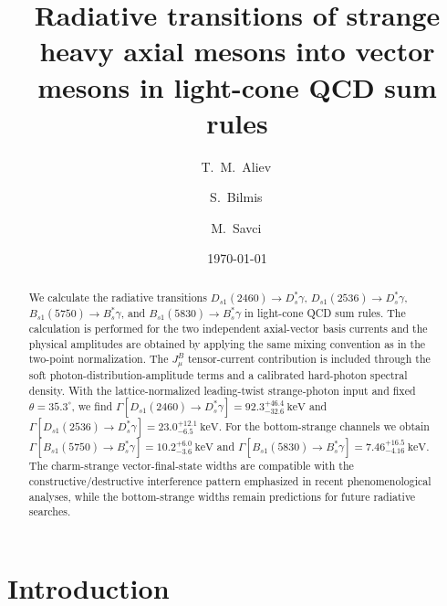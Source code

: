 \documentclass[aps,prd,a4paper,preprint,preprintnumbers,titlepage,
nofootinbib,superscriptaddress]{revtex4-2}
\newcommand{\Dst}{D_s^\ast}
\newcommand{\Dsone}{D_{s1}}
\newcommand{\Bst}{B_s^\ast}
\newcommand{\Bsone}{B_{s1}}
\newcommand{\keV}{\mathrm{keV}}
\providecommand{\orcidlink}[1]{}
\begin{document}
\title{Radiative transitions of strange heavy axial mesons into vector mesons in light-cone QCD sum rules}

\author{T.~M.~Aliev\,\orcidlink{0000-0001-8400-7370}}

\author{S.~Bilmis\,\orcidlink{0000-0002-0830-8873}}

\author{M.~Savci\,\orcidlink{0000-0002-6221-4595}}

\date{\today}

\begin{abstract}
We calculate the radiative transitions
\(\Dsone(2460)\to\Dst\gamma\),
\(\Dsone(2536)\to\Dst\gamma\),
\(B_{s1}(5750)\to\Bst\gamma\), and
\(\Bsone(5830)\to\Bst\gamma\)
in light-cone QCD sum rules.  The calculation is performed for the two
independent axial-vector basis currents and the physical amplitudes are
obtained by applying the same mixing convention as in the two-point
normalization.  The \(J_\mu^B\) tensor-current contribution is included through
the soft photon-distribution-amplitude terms and a calibrated hard-photon
spectral density.  With the lattice-normalized leading-twist strange-photon
input and fixed \(\theta=35.3^\circ\), we find
\(\Gamma[\Dsone(2460)\to\Dst\gamma]=92.3^{+46.4}_{-32.6}~\keV\) and
\(\Gamma[\Dsone(2536)\to\Dst\gamma]=23.0^{+12.1}_{-6.5}~\keV\).
For the bottom-strange channels we obtain
\(\Gamma[B_{s1}(5750)\to\Bst\gamma]=10.2^{+6.0}_{-3.6}~\keV\) and
\(\Gamma[\Bsone(5830)\to\Bst\gamma]=7.46^{+16.5}_{-4.16}~\keV\).
The charm-strange vector-final-state widths are compatible with the
constructive/destructive interference pattern emphasized in recent
phenomenological analyses, while the bottom-strange widths remain predictions
for future radiative searches.
\end{abstract}

\maketitle

\section{Introduction}
\label{sec:intro}
\end{document}
